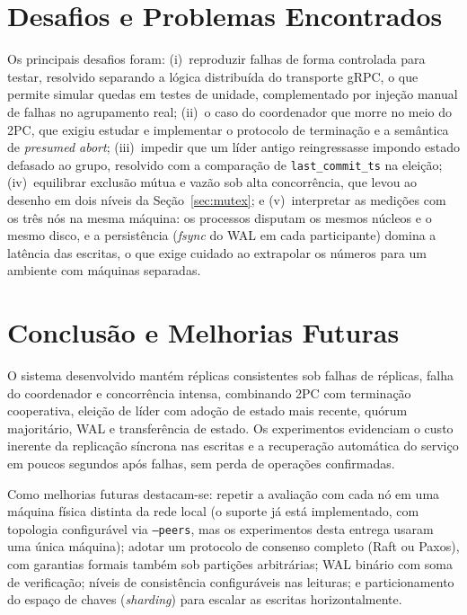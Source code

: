 \documentclass[10pt,twocolumn]{article}
\begin{document}
\section{Desafios e Problemas Encontrados}

Os principais desafios foram: (i)~reproduzir falhas de forma controlada
para testar, resolvido separando a lógica distribuída do transporte
gRPC, o que permite simular quedas em testes de unidade, complementado por
injeção manual de falhas no agrupamento real; (ii)~o caso do coordenador
que morre no meio do 2PC, que exigiu estudar e implementar o protocolo de
terminação e a semântica de \emph{presumed abort}; (iii)~impedir que um
líder antigo reingressasse impondo estado defasado ao grupo, resolvido com
a comparação de \texttt{last\_commit\_ts} na eleição; (iv)~equilibrar
exclusão mútua e vazão sob alta concorrência, que levou ao desenho em dois
níveis da Seção~\ref{sec:mutex}; e (v)~interpretar as medições com os três
nós na mesma máquina: os processos disputam os mesmos núcleos e o mesmo
disco, e a persistência (\emph{fsync} do WAL em cada participante) domina a
latência das escritas, o que exige cuidado ao extrapolar os números para um
ambiente com máquinas separadas.

\section{Conclusão e Melhorias Futuras}

O sistema desenvolvido mantém réplicas consistentes sob falhas de
réplicas, falha do coordenador e concorrência intensa, combinando 2PC com
terminação cooperativa, eleição de líder com adoção de estado mais
recente, quórum majoritário, WAL e transferência de estado. Os
experimentos evidenciam o custo inerente da replicação síncrona nas
escritas e a recuperação automática do serviço em poucos segundos após
falhas, sem perda de operações confirmadas.

Como melhorias futuras destacam-se: repetir a avaliação com cada nó em uma
máquina física distinta da rede local (o suporte já está implementado,
com topologia configurável via \texttt{--peers}, mas os experimentos
desta entrega usaram uma única máquina); adotar um protocolo de consenso completo
(Raft ou Paxos), com garantias formais também sob partições arbitrárias;
WAL binário com soma de verificação; níveis de consistência configuráveis
nas leituras; e particionamento do espaço de chaves (\emph{sharding}) para
escalar as escritas horizontalmente.
\end{document}
